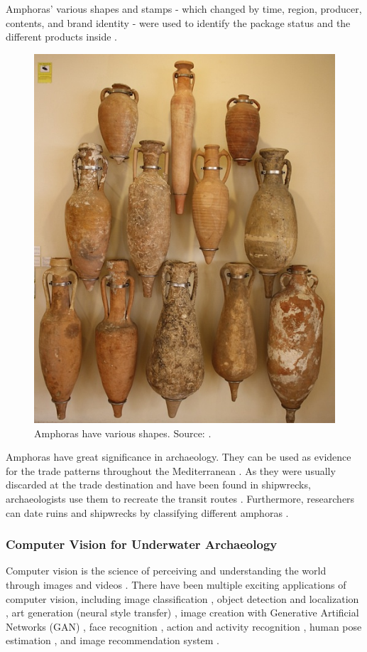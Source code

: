 \documentclass[a4paper, 11pt, oneside]{article}
\begin{document}
Amphoras' various shapes and stamps - which changed by time, region, producer, contents, and brand
identity - were used to identify the package status and the different products inside
\cite{twede2002commercial, worldhistory}.

\begin{figure}[ht]
  \begin{center}
    \includegraphics[width=.5\textwidth]{amphora_various_shapes.jpg}
  \end{center}
  \caption{Amphoras have various shapes. Source: \cite{worldhistory}.}
  \label{fig:amphora}
\end{figure}

Amphoras have great significance in archaeology. They can be used as evidence for the trade patterns throughout
the Mediterranean \cite{twede2002commercial}. As they were usually discarded at the trade destination and have been
found in shipwrecks, archaeologists use them to recreate the transit routes \cite{twede2002commercial}. Furthermore,
researchers can date ruins and shipwrecks by classifying different amphoras \cite{twede2002commercial, grace1985middle}.

\subsubsection{Computer Vision for Underwater Archaeology}

\label{sec:cvForUnderwater}

Computer vision is the science of perceiving and understanding the world through images and videos \cite{elgendy2020deep}.
There have been multiple exciting applications of computer vision, including image classification \cite{rawat2017deep},
object detection and localization \cite{zhao2019object,liu2020deep}, art generation (neural style transfer)
\cite{jing2019neural}, image creation with Generative Artificial Networks (GAN) \cite{goodfellow2014generative},
face recognition \cite{parkhi2015deep}, action and activity recognition \cite{poppe2010survey}, human pose estimation
\cite{toshev2014deeppose}, and image recommendation system \cite{niu2018neural}.
\end{document}
